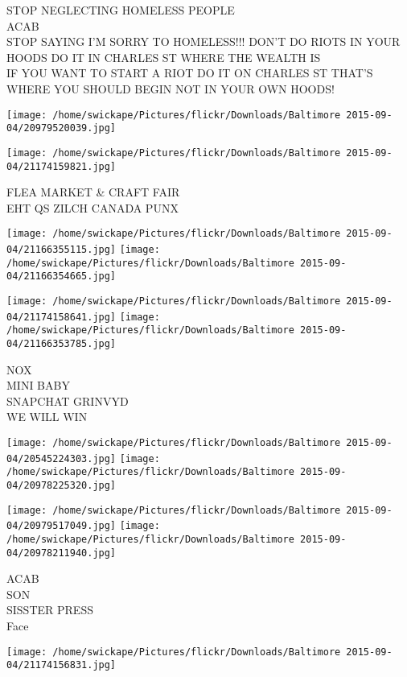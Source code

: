 \documentclass[10pt,letterpaper]{article}
\begin{document}
STOP NEGLECTING HOMELESS PEOPLE\\
ACAB\\
STOP SAYING I'M SORRY TO HOMELESS!!!  DON'T DO RIOTS IN YOUR HOODS DO IT IN CHARLES ST WHERE THE WEALTH IS\\
IF YOU WANT TO START A RIOT DO IT ON CHARLES ST THAT'S WHERE YOU SHOULD BEGIN NOT IN YOUR OWN HOODS!\\
\pagebreak

\texttt{[image: /home/swickape/Pictures/flickr/Downloads/Baltimore 2015-09-04/20979520039.jpg]}

\vspace{0.25in}
\texttt{[image: /home/swickape/Pictures/flickr/Downloads/Baltimore 2015-09-04/21174159821.jpg]}

FLEA MARKET \& CRAFT FAIR\\
EHT QS ZILCH CANADA PUNX\\
\pagebreak

\texttt{[image: /home/swickape/Pictures/flickr/Downloads/Baltimore 2015-09-04/21166355115.jpg]}
\texttt{[image: /home/swickape/Pictures/flickr/Downloads/Baltimore 2015-09-04/21166354665.jpg]}

\texttt{[image: /home/swickape/Pictures/flickr/Downloads/Baltimore 2015-09-04/21174158641.jpg]}
\texttt{[image: /home/swickape/Pictures/flickr/Downloads/Baltimore 2015-09-04/21166353785.jpg]}

NOX\\
MINI BABY\\
SNAPCHAT GRINVYD\\
WE WILL WIN\\
\pagebreak

\texttt{[image: /home/swickape/Pictures/flickr/Downloads/Baltimore 2015-09-04/20545224303.jpg]}
\texttt{[image: /home/swickape/Pictures/flickr/Downloads/Baltimore 2015-09-04/20978225320.jpg]}

\texttt{[image: /home/swickape/Pictures/flickr/Downloads/Baltimore 2015-09-04/20979517049.jpg]}
\texttt{[image: /home/swickape/Pictures/flickr/Downloads/Baltimore 2015-09-04/20978211940.jpg]}

ACAB\\
SON\\
SISSTER PRESS\\
Face\\
\pagebreak

\texttt{[image: /home/swickape/Pictures/flickr/Downloads/Baltimore 2015-09-04/21174156831.jpg]}
\end{document}
